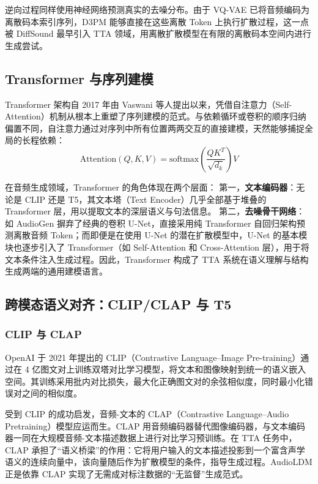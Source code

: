 \documentclass[12pt,a4paper]{article}
\begin{document}
逆向过程同样使用神经网络预测真实的去噪分布。由于 VQ-VAE 已将音频编码为离散码本索引序列，D3PM 能够直接在这些离散 Token 上执行扩散过程，这一点被 DiffSound 最早引入 TTA 领域，用离散扩散模型在有限的离散码本空间内进行生成尝试。

\subsection{Transformer 与序列建模}

Transformer 架构自 2017 年由 Vaswani 等人提出以来，凭借自注意力（Self-Attention）机制从根本上重塑了序列建模的范式。与依赖循环或卷积的顺序归纳偏置不同，自注意力通过对序列中所有位置两两交互的直接建模，天然能够捕捉全局的长程依赖：
\begin{equation}
\text{Attention}(Q, K, V) = \text{softmax} \left( \frac{QK^T}{\sqrt{d_k}} \right) V
\end{equation}

在音频生成领域，Transformer 的角色体现在两个层面：
第一，\textbf{文本编码器}：无论是 CLIP 还是 T5，其文本塔（Text Encoder）几乎全部基于堆叠的 Transformer 层，用以提取文本的深层语义与句法信息。
第二，\textbf{去噪骨干网络}：如 AudioGen 摒弃了经典的卷积 U-Net，直接采用纯 Transformer 自回归架构预测离散音频 Token；而即便是在使用 U-Net 的潜在扩散模型中，U-Net 的基本模块也逐步引入了 Transformer（如 Self-Attention 和 Cross-Attention 层），用于将文本条件注入生成过程。因此，Transformer 构成了 TTA 系统在语义理解与结构生成两端的通用建模语言。

\subsection{跨模态语义对齐：CLIP/CLAP 与 T5}

\subsubsection{CLIP 与 CLAP}
OpenAI 于 2021 年提出的 CLIP（Contrastive Language–Image Pre-training）通过在 4 亿图文对上训练双塔对比学习模型，将文本和图像映射到统一的语义嵌入空间。其训练采用批内对比损失，最大化正确图文对的余弦相似度，同时最小化错误对之间的相似度。

受到 CLIP 的成功启发，音频-文本的 CLAP（Contrastive Language–Audio Pretraining）模型应运而生。CLAP 用音频编码器替代图像编码器，与文本编码器一同在大规模音频-文本描述数据上进行对比学习预训练。在 TTA 任务中，CLAP 承担了“语义桥梁”的作用：它将用户输入的文本描述投影到一个富含声学语义的连续向量中，该向量随后作为扩散模型的条件，指导生成过程。AudioLDM 正是依靠 CLAP 实现了无需成对标注数据的“无监督”生成范式。
\end{document}
